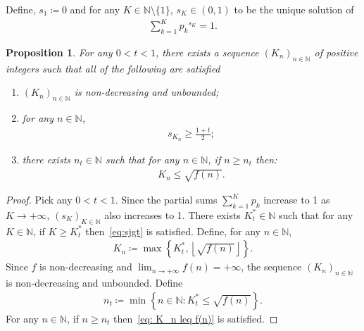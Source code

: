 \documentclass[12pt,reqno]{amsart}
\theoremstyle{definition}
\theoremstyle{plain}
\newtheorem{prop}{Proposition}
\begin{document}
Define, $s_1\coloneqq0$ and for any $K\in\mathbb{N}\setminus\{1\}$, $s_K\in(0,1)$ to be the unique solution of
\begin{align}\label{eq:sM}
    \sum_{k=1}^K {p_k}^{s_K}=1.
\end{align}
\begin{prop}
    For any $0<t<1$, there exists a sequence $(K_n)_{n\in\mathbb{N}}$ of positive integers such that all of the following are satisfied
    \begin{enumerate}
        \item $(K_n)_{n\in\mathbb{N}}$ is non-decreasing and unbounded;
        \item
        for any $n\in\mathbb{N}$,
        \begin{align}\label{eq:sjgt}
            s_{K_n}\geq \frac{1+t}{2};
        \end{align}
        \item 
        there exists $n_t\in\mathbb{N}$ such that for any $n\in\mathbb{N}$, if $n\geq n_t$ then:
        \begin{align}\label{eq: K_n leq f(n)}
            K_n\leq \sqrt{f(n)}.
        \end{align}
    \end{enumerate}
\end{prop}
\begin{proof}
    Pick any $0<t<1$. 
    Since the partial sums $\sum_{k=1}^K p_k$ increase to 1 as $K\to+\infty$,  $(s_K)_{K\in\mathbb{N}}$ also increases to 1. There exists $K_t^*\in\mathbb{N}$ such that for any $K\in\mathbb{N}$, if $K\geq K_t^*$ then~\eqref{eq:sjgt} is satisfied. Define, for any $n\in\mathbb{N}$,
    \begin{align*}
        K_n\coloneqq\max{\left\{K_t^*,\left\lfloor\sqrt{f(n)}\right\rfloor\right\}}.
    \end{align*}
    Since $f$ is non-decreasing and $\lim_{n\to+\infty} f(n)=+\infty$, the sequence $(K_n)_{n\in\mathbb{N}}$ is non-decreasing and unbounded. Define 
    \begin{align*}
        n_t\coloneqq\min{\left\{n\in\mathbb{N}:K_t^*\leq \sqrt{f(n)}\right\}}.
    \end{align*}
    For any $n\in\mathbb{N}$, if $n\geq n_t$ then~\eqref{eq: K_n leq f(n)} is satisfied.
\end{proof}
\end{document}
